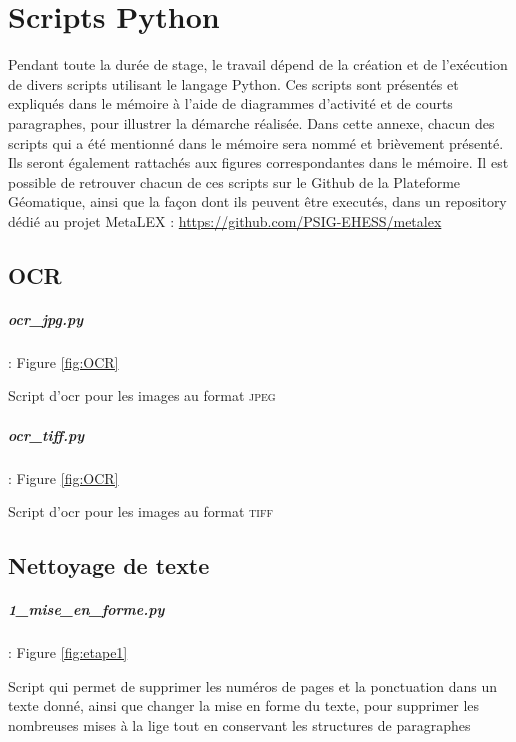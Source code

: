 \chapter{Scripts Python}

Pendant toute la durée de stage, le travail dépend de la création et de l'exécution de divers scripts utilisant le langage Python. Ces scripts sont présentés et expliqués dans le mémoire à l'aide de diagrammes d'activité et de courts paragraphes, pour illustrer la démarche réalisée. 
Dans cette annexe, chacun des scripts qui a été mentionné dans le mémoire sera nommé et brièvement présenté. Ils seront également rattachés aux figures correspondantes dans le mémoire. Il est possible de retrouver chacun de ces scripts sur le Github de la Plateforme Géomatique, ainsi que la façon dont ils peuvent être executés, dans un repository dédié au projet MetaLEX : \url{https://github.com/PSIG-EHESS/metalex}

\section{OCR}
\paragraph{ocr\_jpg.py} : Figure \ref{fig:OCR} 

Script d'\acrshort{ocr} pour les images au format \textsc{jpeg}

\paragraph{ocr\_tiff.py} : Figure \ref{fig:OCR}

Script d'\acrshort{ocr} pour les images au format \textsc{tiff}

\section{Nettoyage de texte}
\paragraph{1\_mise\_en\_forme.py} : Figure \ref{fig:etape1}

Script qui permet de supprimer les numéros de pages et la ponctuation dans un texte donné, ainsi que changer la mise en forme du texte, pour supprimer les nombreuses mises à la lige tout en conservant les structures de paragraphes

